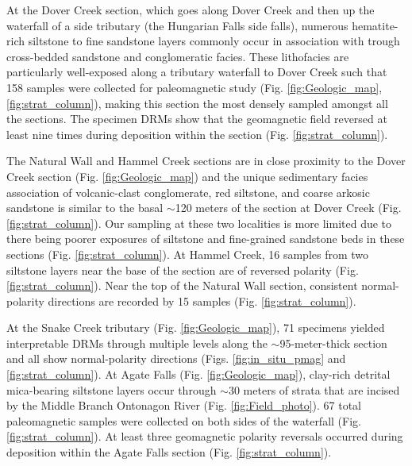 \documentclass[draft]{agujournal2019}
\begin{document}
At the Dover Creek section, which goes along Dover Creek and then up the waterfall of a side tributary (the Hungarian Falls side falls), numerous hematite-rich siltstone to fine sandstone layers commonly occur in association with trough cross-bedded sandstone and conglomeratic facies. These lithofacies are particularly well-exposed along a tributary waterfall to Dover Creek such that 158 samples were collected for paleomagnetic study (Fig. \ref{fig:Geologic_map}, \ref{fig:strat_column}), making this section the most densely sampled amongst all the sections. The specimen DRMs show that the geomagnetic field reversed at least nine times during deposition within the section (Fig. \ref{fig:strat_column}). 

The Natural Wall and Hammel Creek sections are in close proximity to the Dover Creek section (Fig. \ref{fig:Geologic_map}) and the unique sedimentary facies association of volcanic-clast conglomerate, red siltstone, and coarse arkosic sandstone is similar to the basal $\sim$120 meters of the section at Dover Creek (Fig. \ref{fig:strat_column}). Our sampling at these two localities is more limited due to there being poorer exposures of siltstone and fine-grained sandstone beds in these sections (Fig. \ref{fig:strat_column}). At Hammel Creek, 16 samples from two siltstone layers near the base of the section are of reversed polarity (Fig. \ref{fig:strat_column}). Near the top of the Natural Wall section, consistent normal-polarity directions are recorded by 15 samples (Fig. \ref{fig:strat_column}). 

At the Snake Creek tributary (Fig. \ref{fig:Geologic_map}), 71 specimens yielded interpretable DRMs through multiple levels along the $\sim$95-meter-thick section and all show normal-polarity directions (Figs. \ref{fig:in_situ_pmag} and \ref{fig:strat_column}). At Agate Falls (Fig. \ref{fig:Geologic_map}), clay-rich detrital mica-bearing siltstone layers occur through $\sim$30 meters of strata that are incised by the Middle Branch Ontonagon River (Fig. \ref{fig:Field_photo}). 67 total paleomagnetic samples were collected on both sides of the waterfall (Fig. \ref{fig:strat_column}). At least three geomagnetic polarity reversals occurred during deposition within the Agate Falls section (Fig. \ref{fig:strat_column}). 
\end{document}
